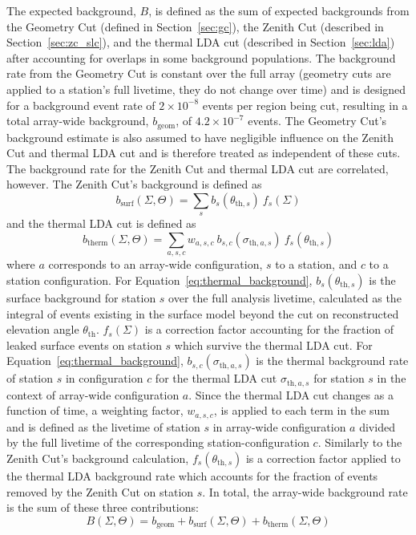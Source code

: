   The expected background, $B$, is defined as the sum of expected backgrounds from the Geometry Cut (defined in Section~\ref{sec:gc}), the Zenith Cut (described in Section~\ref{sec:zc_slc}), and the thermal LDA cut (described in Section~\ref{sec:lda}) after accounting for overlaps in some background populations.
  The background rate from the Geometry Cut is constant over the full array (geometry cuts are applied to a station's full livetime, they do not change over time) and is designed for a background event rate of $2 \times 10^{-8}$ events per region being cut, resulting in a total array-wide background, $b_{\text{geom}}$, of $4.2 \times 10^{-7}$ events.
  The Geometry Cut's background estimate is also assumed to have negligible influence on the Zenith Cut and thermal LDA cut and is therefore treated as independent of these cuts.
  The background rate for the Zenith Cut and thermal LDA cut are correlated, however. 
  The Zenith Cut's background is defined as
  \begin{equation}
    b_{\text{surf}}(\Sigma, \Theta) = \sum_s b_s(\theta_{\text{th}, s}) ~ f_s(\Sigma)
    \label{eq:surface_background}
  \end{equation}
  and the thermal LDA cut is defined as
  \begin{equation}
    b_{\text{therm}}(\Sigma, \Theta) = \sum_{a,s,c} w_{a, s, c} ~ b_{s,c}(\sigma_{\text{th}, a, s}) ~ f_s(\theta_{\text{th},s })
    \label{eq:thermal_background}
  \end{equation}
  where $a$ corresponds to an array-wide configuration, $s$ to a station, and $c$ to a station configuration.
  For Equation~\ref{eq:thermal_background}, $b_s(\theta_{\text{th}, s})$ is the surface background for station $s$ over the full analysis livetime, calculated as the integral of events existing in the surface model beyond the cut on reconstructed elevation angle $\theta_{\text{th}}$.
  $f_s(\Sigma)$ is a correction factor accounting for the fraction of leaked surface events on station $s$ which survive the thermal LDA cut. 
  For Equation~\ref{eq:thermal_background}, $b_{s,c}(\sigma_{\text{th}, a, s})$ is the thermal background rate of station $s$ in configuration $c$ for the thermal LDA cut $\sigma_{\text{th}, a, s}$ for station $s$ in the context of array-wide configuration $a$.
  Since the thermal LDA cut changes as a function of time, a weighting factor, $w_{a, s, c}$, is applied to each term in the sum and is defined as the livetime of station $s$ in array-wide configuration $a$ divided by the full livetime of the corresponding station-configuration $c$.
  Similarly to the Zenith Cut's background calculation, $f_s(\theta_{\text{th},s })$ is a correction factor applied to the thermal LDA background rate which accounts for the fraction of events removed by the Zenith Cut on station $s$.
  In total, the array-wide background rate is the sum of these three contributions:
  \begin{equation}
    B(\Sigma, \Theta) = b_{\text{geom}} + b_{\text{surf}}(\Sigma, \Theta) + b_{\text{therm}}(\Sigma, \Theta)
    \label{eq:total_background}
  \end{equation}

